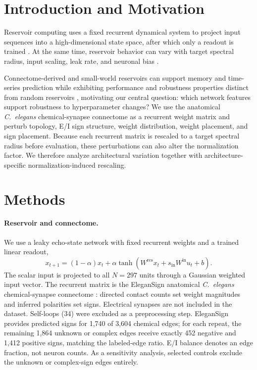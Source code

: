 \documentclass[mlabstract,onecolumn]{jmlr}
\begin{document}
\section{Introduction and Motivation}

Reservoir computing uses a fixed recurrent dynamical system to project input sequences into a high-dimensional state space, after which only a readout is trained \citep{jaeger_echo_state_2001,maass_lsm_2002}. At the same time, reservoir behavior can vary with target spectral radius, input scaling, leak rate, and neuronal bias \citep{Lukosevicius2012PracticalESN,Matzner2022HyperparameterTuningESN}. 

Connectome-derived and small-world reservoirs can support memory and time-series prediction while exhibiting performance and robustness properties distinct from random reservoirs \citep{KAWAI201915,morra_daley_2022,morra_fly_rc_2023}, motivating our central question: which network features support robustness to hyperparameter changes? We use the anatomical \textit{C.~elegans} chemical-synapse connectome as a recurrent weight matrix and perturb topology, E/I sign structure, weight distribution, weight placement, and sign placement. Because each recurrent matrix is rescaled to a target spectral radius before evaluation, these perturbations can also alter the normalization factor. We therefore analyze architectural variation together with architecture-specific normalization-induced rescaling.

\section{Methods}
\paragraph{Reservoir and connectome.}
We use a leaky echo-state network with fixed recurrent weights and a trained linear readout,
\begin{equation}
x_{t+1}=(1-\alpha)x_t+\alpha\tanh\!\left(W^{\mathrm{res}}x_t+s_{\mathrm{in}}W^{\mathrm{in}}u_t+b\right).
\label{eq:state}
\end{equation}
The scalar input is projected to all $N=297$ units through a Gaussian weighted input vector. The recurrent matrix is the EleganSign anatomical \textit{C.~elegans} chemical-synapse connectome \citep{fenyves_szilagyi_2020}: directed contact counts set weight magnitudes and inferred polarities set signs. Electrical synapses are not included in the dataset. Self-loops (34) were excluded as a preprocessing step. EleganSign provides predicted signs for 1,740 of 3,604 chemical edges; for each repeat, the remaining 1,864 unknown or complex edges receive exactly 452 negative and 1,412 positive signs, matching the labeled-edge ratio. E/I balance denotes an edge fraction, not neuron counts. As a sensitivity analysis, selected controls exclude the unknown or complex-sign edges entirely.
\end{document}
